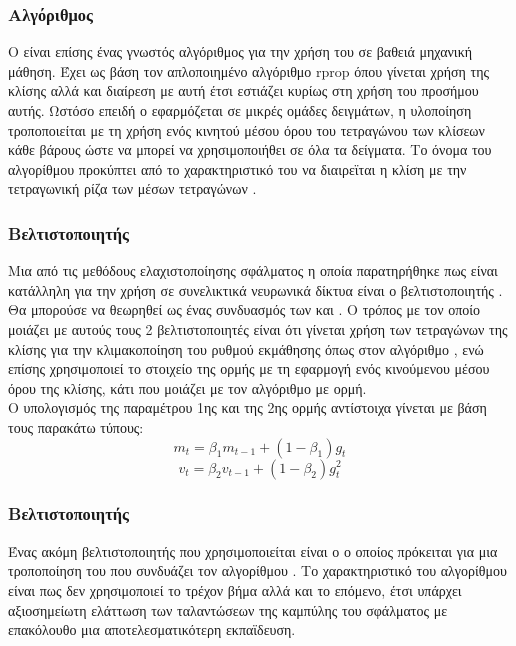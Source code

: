 \subsubsection{Αλγόριθμος }
Ο  είναι επίσης ένας γνωστός αλγόριθμος για την χρήση του σε βαθειά μηχανική μάθηση. Έχει ως βάση τον απλοποιημένο αλγόριθμο rprop όπου γίνεται χρήση της κλίσης αλλά και διαίρεση με αυτή έτσι εστιάζει κυρίως στη χρήση του προσήμου αυτής. Ωστόσο επειδή ο  εφαρμόζεται σε μικρές ομάδες δειγμάτων, η υλοποίηση τροποποιείται με τη χρήση ενός κινητού μέσου όρου του τετραγώνου των κλίσεων κάθε βάρους ώστε να μπορεί να χρησιμοποιήθει σε όλα τα δείγματα. Το όνομα του αλγορίθμου προκύπτει από το χαρακτηριστικό του να διαιρεϊται η κλίση με την τετραγωνική ρίζα των μέσων τετραγώνων .
\subsubsection{Βελτιστοποιητής }
Μια από τις μεθόδους ελαχιστοποίησης σφάλματος η οποία παρατηρήθηκε πως είναι κατάλληλη για την χρήση σε συνελικτικά νευρωνικά δίκτυα είναι ο βελτιστοποιητής . Θα μπορούσε να θεωρηθεί ως ένας συνδυασμός των  και . Ο τρόπος με τον οποίο μοιάζει με αυτούς τους 2 βελτιστοποιητές είναι ότι γίνεται χρήση των τετραγώνων της κλίσης για την κλιμακοποίηση του ρυθμού εκμάθησης όπως στον αλγόριθμο , ενώ επίσης χρησιμοποιεί το στοιχείο της ορμής με τη εφαρμογή ενός κινούμενου μέσου όρου της κλίσης, κάτι που μοιάζει με τον αλγόριθμο  με ορμή.\\

Ο υπολογισμός της παραμέτρου 1ης και της 2ης ορμής αντίστοιχα γίνεται με βάση τους παρακάτω τύπους:
$$m_t=\beta_1m_{t-1}+\left(1-\beta_1\right)g_t$$
$$v_t=\beta_2v_{t-1}+\left(1-\beta_2\right)g_t^2$$

\subsubsection{Βελτιστοποιητής }
Ένας ακόμη βελτιστοποιητής που χρησιμοποιείται είναι ο  ο οποίος πρόκειται για μια τροποποίηση του  που συνδυάζει τον αλγορίθμου . Το χαρακτηριστικό του αλγορίθμου  είναι πως δεν χρησιμοποιεί το τρέχον βήμα αλλά και το επόμενο, έτσι υπάρχει αξιοσημείωτη ελάττωση των ταλαντώσεων της καμπύλης του σφάλματος με επακόλουθο μια αποτελεσματικότερη εκπαϊδευση.\\


